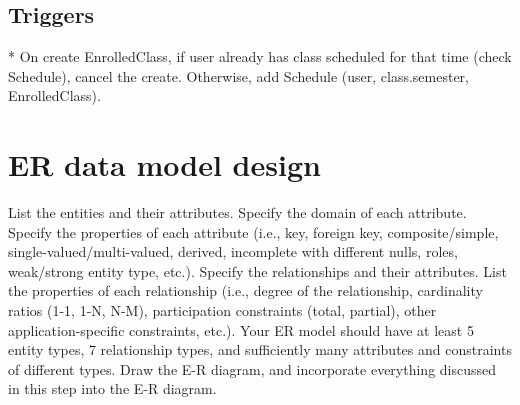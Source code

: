 \documentclass[11pt,oneside,a4paper]{article}
\begin{document}
\subsection{Triggers}
	* On create EnrolledClass, if user already has class scheduled for that
	time (check Schedule), cancel the create. Otherwise, add Schedule (user, class.semester,
	EnrolledClass). 
\section{ER data model design}
List the entities and their attributes. Specify the domain of each attribute. Specify the properties of each attribute (i.e., key, foreign key, composite/simple, single-valued/multi-valued, derived, incomplete with different nulls, roles, weak/strong entity type, etc.). Specify the relationships and their attributes. List the properties of each relationship (i.e., degree of the relationship, cardinality ratios (1-1, 1-N, N-M), participation constraints (total, partial), other application-specific constraints, etc.). Your ER model should have at least 5 entity types, 7 relationship types, and sufficiently many attributes and constraints of different types. Draw the E-R diagram, and incorporate everything discussed in this step into the E-R diagram. 
\end{document}
